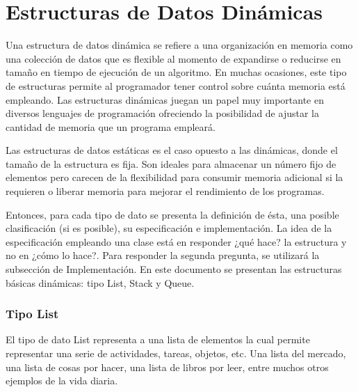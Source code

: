 \newpage
\part{Estructuras de Datos Dinámicas}
\setcounter{section}{0}

Una estructura de datos dinámica se refiere a una organización en memoria como una colección de datos que es flexible al momento de expandirse o reducirse en tamaño en tiempo de ejecución de un algoritmo. En muchas ocasiones, este tipo de estructuras permite al programador tener control sobre cuánta memoria está empleando. Las estructuras dinámicas juegan un papel muy importante en diversos lenguajes de programación ofreciendo la posibilidad de ajustar la cantidad de memoria que un programa empleará.

Las estructuras de datos estáticas es el caso opuesto a las dinámicas, donde el tamaño de la estructura es fija. Son ideales para almacenar un número fijo de elementos pero carecen de la flexibilidad para consumir memoria adicional si la requieren o liberar memoria para mejorar el rendimiento de los programas.

Entonces, para cada tipo de dato se presenta la definición de ésta, una posible clasificación (si es posible), su especificación e implementación. La idea de la especificación empleando una clase está en responder ¿qué hace? la estructura y no en ¿cómo lo hace?. Para responder la segunda pregunta, se utilizará la subsección de Implementación. En este documento se presentan las estructuras básicas dinámicas: tipo List, Stack y Queue.

\section{Tipo List}

El tipo de dato List representa a una lista de elementos la cual permite representar una serie de actividades, tareas, objetos, etc. Una lista del mercado, una lista de cosas por hacer, una lista de libros por leer, entre muchos otros ejemplos de la vida diaria.

